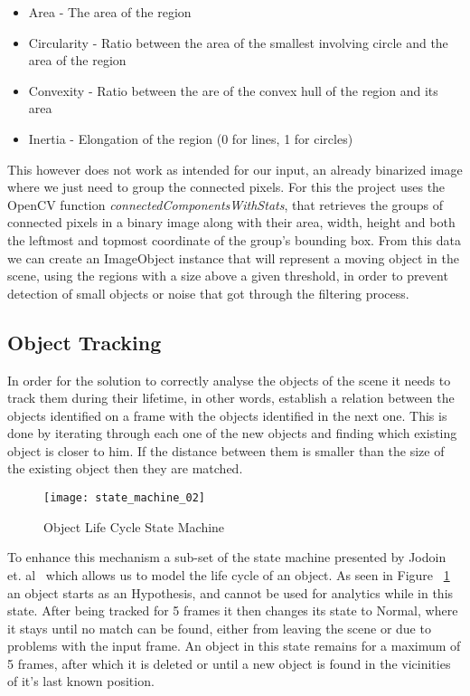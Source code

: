 \begin{itemize}
	\item Area - The area of the region
	\item Circularity - Ratio between the area of the smallest involving circle and the area of the region
	\item Convexity - Ratio between the are of the convex hull of the region and its area
	\item Inertia - Elongation of the region (0 for lines, 1 for circles)
\end{itemize}

This however does not work as intended for our input, an already binarized image where we just need to group the connected pixels. For this the project uses the OpenCV function \textit{connectedComponentsWithStats}, that retrieves the groups of connected pixels in a binary image along with their area, width, height and both the leftmost and topmost coordinate of the group's bounding box. From this data we can create an ImageObject instance that will represent a moving object in the scene, using the regions with a size above a given threshold, in order to prevent detection of small objects or noise that got through the filtering process.


\subsection{Object Tracking}

In order for the solution to correctly analyse the objects of the scene it needs to track them during their lifetime, in other words, establish a relation between the objects identified on a frame with the objects identified in the next one. This is done by iterating through each one of the new objects and finding which existing object is closer to him. If the distance between them is smaller than the size of the existing object then they are matched.

\begin{figure}[h]
  \begin{center}
    \leavevmode
    \texttt{[image: state\_machine\_02]}
    \caption{Object Life Cycle State Machine}
    \label{fig:object_state_machine}
  \end{center}
\end{figure}

To enhance this mechanism a sub-set of the state machine presented by Jodoin et. al~\cite{jodoin_urban_2014} which allows us to model the life cycle of an object. As seen in Figure ~\ref{fig:object_state_machine} an object starts as an Hypothesis, and cannot be used for analytics while in this state. After being tracked for 5 frames it then changes its state to Normal, where it stays until no match can be found, either from leaving the scene or due to problems with the input frame. An object in this state remains for a maximum of 5 frames, after which it is deleted or until a new object is found in the vicinities of it's last known position.

